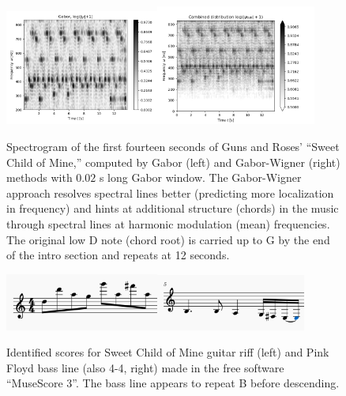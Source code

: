 \documentclass{article}
\begin{document}
\begin{figure}[t!]
  \centering
  \includegraphics[width=0.45\textwidth]{gnr/gnr_gab_1000pt_window}\includegraphics[width=0.47\textwidth]{gnr/combined}
  \caption{Spectrogram of the first fourteen seconds of Guns and Roses' ``Sweet Child of Mine,'' computed by Gabor (left) and Gabor-Wigner (right) methods with $0.02$ s long Gabor window. The Gabor-Wigner approach resolves spectral lines better (predicting more localization in frequency) and hints at additional structure (chords) in the music through spectral lines at harmonic modulation (mean) frequencies. The original low D note (chord root) is carried up to G by the end of the intro section and repeats at 12 seconds.}\label{gnr}
\end{figure}

\begin{figure}[h!]
  \centering
  \includegraphics[width=0.45\textwidth]{music_score/gnr}\includegraphics[width=0.44\textwidth]{music_score/floyd_option2}
  \caption{Identified scores for Sweet Child of Mine guitar riff (left) and Pink Floyd bass line (also 4-4, right) made in the free software ``MuseScore 3''. The bass line appears to repeat B before descending.}\label{score}
\end{figure}
\end{document}

